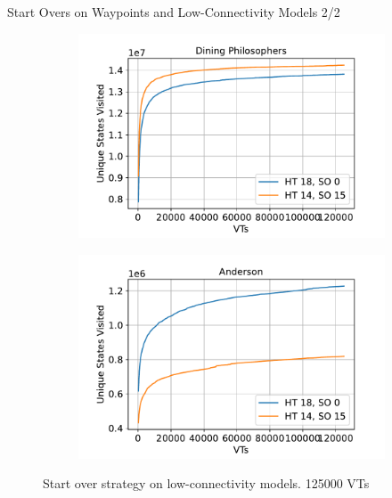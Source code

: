 \documentclass[aspectratio=169]{beamer}
\begin{document}
{  \begin{frame}{Start Overs on Waypoints and Low-Connectivity Models 2/2}
      \begin{figure}
          \begin{subfigure}[b]{.49\textwidth}
              \centering
              \includegraphics[width=\textwidth]{../../evaluation/output-assets/EXP-13-start-overs-low-connectivity-1.pdf}
              \label{fig:evaluation:EXP-13:1}
          \end{subfigure}
          \begin{subfigure}[b]{.49\textwidth}
              \centering
              \includegraphics[width=\textwidth]{../../evaluation/output-assets/EXP-13-start-overs-low-connectivity-2.pdf}
              \label{fig:evaluation:EXP-13:2}
          \end{subfigure}
          \caption{Start over strategy on low-connectivity models. \num{125000} VTs}
          \label{fig:evaluation:EXP-13}
      \end{figure}
  \end{frame}
 }
\end{document}
